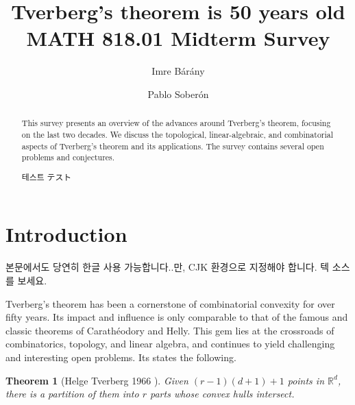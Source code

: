 \documentclass[11pt]{article}
\title{Tverberg's theorem is 50 years old\\
	\large MATH 818.01 Midterm Survey
}
\author{Imre B\'ar\'any \and Pablo Sober\'on}
\date{}
\newtheorem{theorem}{Theorem}
\newcommand{\rr}{\mathbb{R}}
\DeclareMathOperator{\conv}{conv}
\begin{document}
	
	\maketitle
	
	\begin{abstract}
		This survey presents an overview of the advances around Tverberg's theorem, focusing on the last two decades.  We discuss the topological, linear-algebraic, and combinatorial aspects of Tverberg's theorem and its applications.  The survey contains several open problems and conjectures.
		\begin{CJK}{UTF8}{mj}
			테스트 テスト
		\end{CJK}
	\end{abstract}
	
	\section{Introduction}\label{section-introduction}
	
	\begin{CJK}{UTF8}{mj}
		본문에서도 당연히 한글 사용 가능합니다..만, CJK 환경으로 지정해야 합니다. 텍 소스를 보세요.
	\end{CJK}
	
	Tverberg's theorem has been a cornerstone of combinatorial convexity for over fifty years. Its impact and influence is only comparable to that of the famous and classic theorems of Carath\'eodory and Helly. This gem lies at the crossroads of combinatorics, topology, and linear algebra, and continues to yield challenging and interesting open problems.  Its states the following.%
	
	\begin{theorem}[Helge Tverberg 1966 \cite{Tverberg:1966tb}]
		Given $(r-1)(d+1)+1$ points in $\rr^d$, there is a partition of them into $r$ parts whose convex hulls intersect.
	\end{theorem}
	
\end{document}

